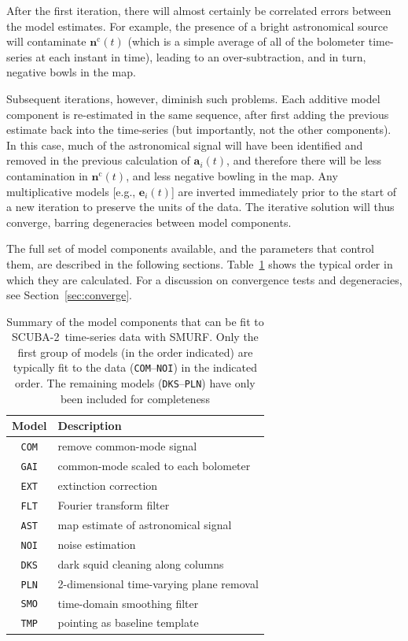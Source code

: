 \documentclass[useAMS,usenatbib,nofootinbib]{mn2e}
\newcommand{\scuba}{SCUBA-2}
\newcommand{\model}[1]{\texttt{#1}}
\begin{document}
After the first iteration, there will almost certainly be correlated
errors between the model estimates. For example, the presence of a
bright astronomical source will contaminate $\mathbf{n}^\mathrm{c}(t)$
(which is a simple average of all of the bolometer time-series at each
instant in time), leading to an over-subtraction, and in turn,
negative bowls in the map.

Subsequent iterations, however, diminish such problems. Each additive
model component is re-estimated in the same sequence, after first
adding the previous estimate back into the time-series (but
importantly, not the other components). In this case, much of the
astronomical signal will have been identified and removed in the
previous calculation of $\mathbf{a}_i(t)$, and therefore there will be
less contamination in $\mathbf{n}^\mathrm{c}(t)$, and less negative
bowling in the map. Any multiplicative models [e.g.,
$\mathbf{e}_i(t)$] are inverted immediately prior to the start of a
new iteration to preserve the units of the data. The iterative
solution will thus converge, barring degeneracies between model
components.

The full set of model components available, and the parameters that
control them, are described in the following
sections. Table~\ref{tab:components} shows the typical order in which
they are calculated. For a discussion on convergence tests and
degeneracies, see Section~\ref{sec:converge}.

\begin{table}
  \caption{Summary of the model components that can be fit to
    \scuba\ time-series data with SMURF. Only the first group of
    models (in the order indicated) are typically fit to the data
    (\model{COM}--\model{NOI}) in the indicated order. The remaining
    models (\model{DKS}--\model{PLN}) have only been included for
    completeness}
  \vspace{0.2cm}
  \centering
  \begin{tabular}{c|l}
    \hline
    Model & Description \\
    \hline
    \model{COM} & remove common-mode signal \\
    \model{GAI} & common-mode scaled to each bolometer \\
    \model{EXT} & extinction correction \\
    \model{FLT} & Fourier transform filter \\
    \model{AST} & map estimate of astronomical signal \\
    \model{NOI} & noise estimation \\
    \hline
    \model{DKS} & dark squid cleaning along columns \\
    \model{PLN} & 2-dimensional time-varying plane removal \\
    \model{SMO} & time-domain smoothing filter \\
    \model{TMP} & pointing as baseline template \\
    \hline
    \end{tabular}
  \label{tab:components}
\end{table}
\end{document}
